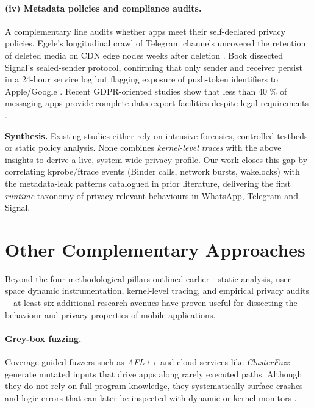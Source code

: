 \documentclass[a4paper,12pt]{report}
\begin{document}
\paragraph{(iv) Metadata policies and compliance audits.}
A complementary line audits whether apps meet their self-declared privacy
policies.  Egele’s longitudinal crawl of Telegram channels uncovered the
retention of deleted media on CDN edge nodes weeks after deletion
\cite{egele2019cdn}.
Bock dissected Signal’s sealed-sender protocol, confirming that only
sender and receiver persist in a 24-hour service log but flagging
exposure of push-token identifiers to Apple/Google \cite{bock2020sealed}.
Recent GDPR-oriented studies show that less than 40 \% of messaging apps
provide complete data-export facilities despite legal requirements
\cite{frolov2022gdpr}.


\medskip
\noindent\textbf{Synthesis.}
Existing studies either rely on intrusive forensics, controlled testbeds
or static policy analysis.  None combines \emph{kernel-level traces} with
the above insights to derive a live, system-wide privacy profile.
Our work closes this gap by correlating kprobe/ftrace events
(Binder calls, network bursts, wakelocks) with the metadata-leak patterns
catalogued in prior literature, delivering the first \emph{runtime}
taxonomy of privacy-relevant behaviours in WhatsApp, Telegram and Signal.


\section{Other Complementary Approaches}\label{sec:rw:other}

Beyond the four methodological pillars outlined earlier—static analysis, user-space dynamic instrumentation, kernel-level tracing, and empirical privacy audits—at least six additional research avenues have proven useful for dissecting the behaviour and privacy properties of mobile applications.

\paragraph{Grey-box fuzzing.}  Coverage-guided fuzzers such as \emph{AFL++} and cloud services like \emph{ClusterFuzz} generate mutated inputs that drive apps along rarely executed paths.  Although they do not rely on full program knowledge, they systematically surface crashes and logic errors that can later be inspected with dynamic or kernel monitors \cite{aflpp2023,clusterfuzz2020}.
\end{document}
